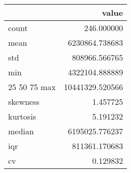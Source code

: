 \begin{tabular}{lr}
\toprule
 & value \\
\midrule
count & 246.000000 \\
mean & 6230864.738683 \\
std & 808966.566765 \\
min & 4322104.888889 \\
25%
50%
75%
max & 10441329.520566 \\
skewness & 1.457725 \\
kurtosis & 5.191232 \\
median & 6195025.776237 \\
iqr & 811361.170683 \\
cv & 0.129832 \\
\bottomrule
\end{tabular}

